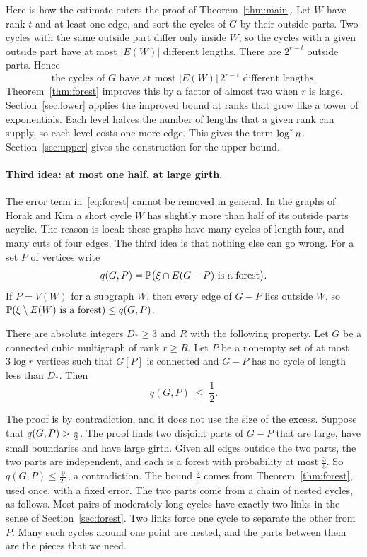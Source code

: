 Here is how the estimate enters the proof of Theorem~\ref{thm:main}. Let $W$ have rank $t$ and at
least one edge, and sort the cycles of $G$ by their outside parts. Two cycles with the same outside
part differ only inside $W$, so the cycles with a given outside part have at most $|E(W)|$
different lengths. There are $2^{r-t}$ outside parts. Hence
\begin{equation}\label{eq:trivial}
  \text{the cycles of $G$ have at most }|E(W)|\,2^{r-t}\text{ different lengths.}
\end{equation}
Theorem~\ref{thm:forest} improves this by a factor of almost two when $r$ is large.
Section~\ref{sec:lower} applies the improved bound at ranks that grow like a tower of exponentials.
Each level halves the number of lengths that a given rank can supply, so each level costs one more
edge. This gives the term $\log^{*} n$. Section~\ref{sec:upper} gives the construction for the upper
bound.

\paragraph{Third idea: at most one half, at large girth.}
The error term in~\eqref{eq:forest} cannot be removed in general. In the graphs of Horak and Kim a
short cycle $W$ has slightly more than half of its outside parts acyclic. The reason is local: these
graphs have many cycles of length four, and many cuts of four edges. The third idea is that nothing
else can go wrong. For a set $P$ of vertices write
\[
  q(G,P)=\mathbb{P}\bigl(\xi\cap E(G-P)\text{ is a forest}\bigr).
\]
If $P=V(W)$ for a subgraph $W$, then every edge of $G-P$ lies outside $W$, so
$\mathbb{P}(\xi\setminus E(W)\text{ is a forest})\le q(G,P)$.

\begin{theorem}\label{thm:half}
There are absolute integers $D_{*}\ge3$ and $R$ with the following property. Let $G$ be a connected
cubic multigraph of rank $r\ge R$. Let $P$ be a nonempty set of at most $3\log r$ vertices such that
$G[P]$ is connected and $G-P$ has no cycle of length less than $D_{*}$. Then
\[
  q(G,P)\;\le\;\frac12 .
\]
\end{theorem}

The proof is by contradiction, and it does not use the size of the excess. Suppose that
$q(G,P)>\tfrac12$. The proof finds two disjoint parts of $G-P$ that are large, have small boundaries
and have large girth. Given all edges outside the two parts, the two parts are independent, and
each is a forest with probability at most $\frac35$. So $q(G,P)\le\frac9{25}$, a contradiction. The
bound $\frac35$ comes from Theorem~\ref{thm:forest}, used once, with a fixed error. The two parts
come from a chain of nested cycles, as follows. Most pairs of moderately long cycles have exactly
two links in the sense of Section~\ref{sec:forest}. Two links force one cycle to separate the other
from $P$. Many such cycles around one point are nested, and the parts between them are the pieces
that we need.

